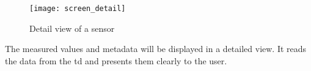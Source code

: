 \begin{figure}[H]
    \centering
    \texttt{[image: screen\_detail]}
    \caption{Detail view of a sensor}
    \label{fig:screen_result_details}
\end{figure}

The measured values and metadata will be displayed in a detailed view. It reads the data from the \gls{td} and presents them clearly to the user.



